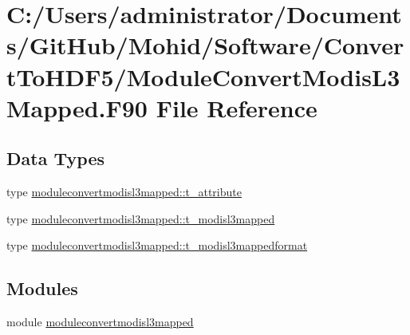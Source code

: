 \hypertarget{_module_convert_modis_l3_mapped_8_f90}{}\section{C\+:/\+Users/administrator/\+Documents/\+Git\+Hub/\+Mohid/\+Software/\+Convert\+To\+H\+D\+F5/\+Module\+Convert\+Modis\+L3\+Mapped.F90 File Reference}
\label{_module_convert_modis_l3_mapped_8_f90}
\subsection*{Data Types}
\begin{DoxyCompactItemize}
\item 
type \mbox{\hyperlink{structmoduleconvertmodisl3mapped_1_1t__attribute}{moduleconvertmodisl3mapped\+::t\+\_\+attribute}}
\item 
type \mbox{\hyperlink{structmoduleconvertmodisl3mapped_1_1t__modisl3mapped}{moduleconvertmodisl3mapped\+::t\+\_\+modisl3mapped}}
\item 
type \mbox{\hyperlink{structmoduleconvertmodisl3mapped_1_1t__modisl3mappedformat}{moduleconvertmodisl3mapped\+::t\+\_\+modisl3mappedformat}}
\end{DoxyCompactItemize}
\subsection*{Modules}
\begin{DoxyCompactItemize}
\item 
module \mbox{\hyperlink{namespacemoduleconvertmodisl3mapped}{moduleconvertmodisl3mapped}}
\end{DoxyCompactItemize}
